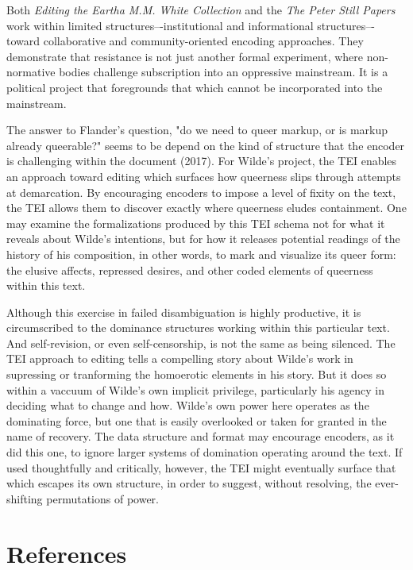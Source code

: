 \documentclass[11pt]{article}
\begin{document}
Both \emph{Editing the Eartha M.M. White Collection} and the \emph{The Peter
Still Papers} work within limited structures–-institutional and
informational structures–-toward collaborative and community-oriented
encoding approaches. They demonstrate that resistance is not just
another formal experiment, where non-normative bodies challenge
subscription into an oppressive mainstream. It is a political project
that foregrounds that which cannot be incorporated into the
mainstream. 

The answer to Flander's question, "do we need to queer markup, or is
markup already queerable?" seems to be depend on the kind of structure
that the encoder is challenging within the document (2017). For
Wilde's project, the TEI enables an approach toward editing which
surfaces how queerness slips through attempts at demarcation. By
encouraging encoders to impose a level of fixity on the text, the TEI
allows them to discover exactly where queerness eludes
containment. One may examine the formalizations produced by this TEI
schema not for what it reveals about Wilde's intentions, but for how
it releases potential readings of the history of his composition, in
other words, to mark and visualize its queer form: the elusive
affects, repressed desires, and other coded elements of queerness
within this text.

Although this exercise in failed disambiguation is highly productive,
it is circumscribed to the dominance structures working within this
particular text. And self-revision, or even self-censorship, is not
the same as being silenced. The TEI approach to editing tells a
compelling story about Wilde's work in supressing or tranforming the
homoerotic elements in his story. But it does so within a vaccuum of
Wilde's own implicit privilege, particularly his agency in deciding
what to change and how. Wilde's own power here operates as the
dominating force, but one that is easily overlooked or taken for
granted in the name of recovery. The data structure and format may
encourage encoders, as it did this one, to ignore larger systems of
domination operating around the text. If used thoughtfully and
critically, however, the TEI might eventually surface that which
escapes its own structure, in order to suggest, without resolving, the
ever-shifting permutations of power.

\section{References}
\label{sec:orga72503d}
\end{document}
